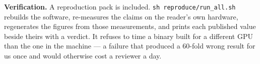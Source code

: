 \documentclass[11pt,a4paper]{article}
\begin{document}
\textbf{Verification.} A reproduction pack is included. \texttt{sh reproduce/run\_all.sh} rebuilds the software, re-measures the claims on the reader's own hardware, regenerates the figures from those measurements, and prints each published value beside theirs with a verdict. It refuses to time a binary built for a different GPU than the one in the machine --- a failure that produced a 60-fold wrong result for us once and would otherwise cost a reviewer a day.
\end{document}
